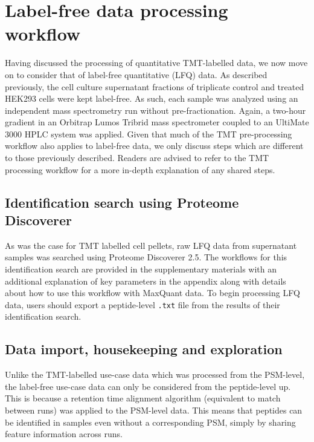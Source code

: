 \documentclass[9pt,a4paper,]{extarticle}
\begin{document}
\section{Label-free data processing workflow}\label{label-free-data-processing-workflow}

Having discussed the processing of quantitative TMT-labelled data, we now move
on to consider that of label-free quantitative (LFQ) data. As described
previously, the cell culture supernatant fractions of triplicate control and
treated HEK293 cells were kept label-free. As such, each sample was analyzed using
an independent mass spectrometry run without pre-fractionation. Again, a two-hour
gradient in an Orbitrap Lumos Tribrid mass spectrometer coupled to an UltiMate
3000 HPLC system was applied. Given that much of the TMT pre-processing workflow
also applies to label-free data, we only discuss steps which are different to
those previously described. Readers are advised to refer to the TMT processing
workflow for a more in-depth explanation of any shared steps.

\subsection{Identification search using Proteome Discoverer}\label{identification-search-using-proteome-discoverer}

As was the case for TMT labelled cell pellets, raw LFQ data from supernatant
samples was searched using Proteome Discoverer 2.5. The workflows for this
identification search are provided in the supplementary materials with an additional
explanation of key parameters in the appendix along with details about how to
use this workflow with MaxQuant data. To begin processing LFQ data,
users should export a peptide-level \texttt{.txt} file from the results of their
identification search.

\subsection{Data import, housekeeping and exploration}\label{data-import-housekeeping-and-exploration-1}

Unlike the TMT-labelled use-case data which was processed from the PSM-level, the
label-free use-case data can only be considered from the peptide-level up. This
is because a retention time alignment algorithm (equivalent to match between runs)
was applied to the PSM-level data. This means that peptides can be identified in
samples even without a corresponding PSM, simply by sharing feature information
across runs.
\end{document}
